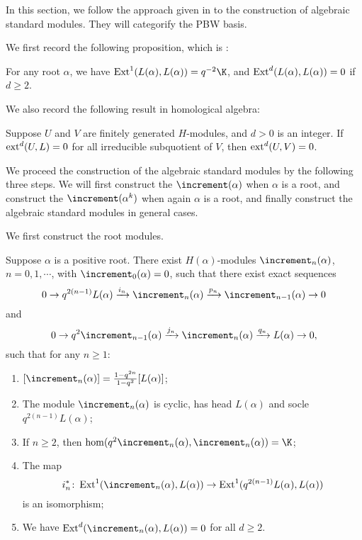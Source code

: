 In this section, we follow the approach given
in \cite{BKM} to the construction of algebraic standard modules. They will
categorify the PBW basis. 

We first record the following proposition, which is 
\cite[Theorem 3.1]{BKM}:

\begin{proposition}\label{ext-of-cuspidal}
    For any root $\alpha$, we have
    $\Ext^1(L(\alpha),L(\alpha)) = q^{-2}\K$, and
    $\operatorname{Ext}^d(L(\alpha),L(\alpha)) = 0$ if $d\ge 2$.
\end{proposition}

We also record the following result in homological algebra:

\begin{proposition}\label{ext-of-subquo}
    Suppose $U$ and $V$ are finitely generated $H$-modules, and $d>0$ is an integer.
    If $\operatorname{ext}^d(U,L) = 0$ for all irreducible subquotient of $V$,
    then $\operatorname{ext}^d(U,V) = 0$.
\end{proposition}

We proceed the construction of the algebraic standard modules by the following three steps.
We will first construct the  $\std(\alpha)$
when $\alpha$ is a root, and construct the  $\std(\alpha^k)$
when again $\alpha$ is a root, and finally construct
the algebraic standard modules in general cases.

We first construct the root modules.

\begin{lemma}\label{filtr-of-std}
    Suppose $\alpha$ is a positive root.
    There exist $H(\alpha)$-modules $\std_n(\alpha)$,
    $n = 0,1,\cdots$, with $\std_0(\alpha) = 0$, such that 
    there exist exact sequences 
    \begin{equation}\label{exact-1}0\to q^{2(n-1)}L(\alpha)\xrightarrow{i_n}
    \std_n(\alpha)\xrightarrow{p_n}\std_{n-1}(\alpha)\to 0\end{equation}
    and \begin{equation}\label{exact-2}0\to q^2\std_{n-1}(\alpha)\xrightarrow{j_n}
    \std_n(\alpha)\xrightarrow{q_n} L(\alpha)\to 0,\end{equation}
    such that for any $n\ge 1$:
    \begin{enumerate}[1)]
        \item $[\std_n(\alpha)] = \frac{1-q^{2n}}{1-q^2}[L(\alpha)]$;
        \item The module $\std_n(\alpha)$ is cyclic, has head $L(\alpha)$
        and socle $q^{2(n-1)}L(\alpha)$;
        \item If $n\ge 2$, then $\hom(q^2\std_n(\alpha),
        \std_n(\alpha)) = \K$;
        \item The map 
        \[ 
            i_n^*\:\Ext^1(\std_n(\alpha),L(\alpha))
            \to\Ext^1(q^{2(n-1)}L(\alpha),L(\alpha))
        \] 
        is an isomorphism;
        \item We have $\Ext^d(\std_n(\alpha),L(\alpha)) = 0$ for all $d\ge 2$.
    \end{enumerate}
\end{lemma}

